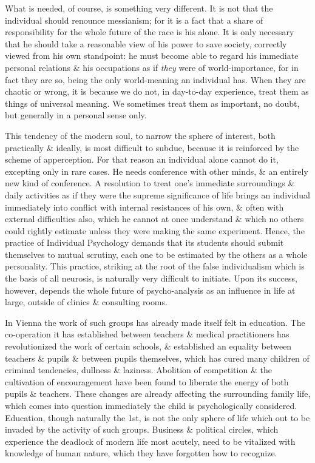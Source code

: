 \documentclass{article}
\numberwithin{equation}{section}
\begin{document}
What is needed, of course, is something very different. It is not that the individual should renounce messianism; for it is a fact that a share of responsibility for the whole future of the race is his alone. It is only necessary that he should take a reasonable view of his power to save society, correctly viewed from his own standpoint: he must become able to regard his immediate personal relations \& his occupations as if \textit{they} were of world-importance, for in fact they are so, being the only world-meaning an individual has. When they are chaotic or wrong, it is because we do not, in day-to-day experience, treat them as things of universal meaning. We sometimes treat them as important, no doubt, but generally in a personal sense only.

This tendency of the modern soul, to narrow the sphere of interest, both practically \& ideally, is most difficult to subdue, because it is reinforced by the scheme of apperception. For that reason an individual alone cannot do it, excepting only in rare cases. He needs conference with other minds, \& an entirely new kind of conference. A resolution to treat one's immediate surroundings \& daily activities as if they were the supreme significance of life brings an individual immediately into conflict with internal resistances of his own, \& often with external difficulties also, which he cannot at once understand \& which no others could rightly estimate unless they were making the same experiment. Hence, the practice of Individual Psychology demands that its students should submit themselves to mutual scrutiny, each one to be estimated by the others as a whole personality. This practice, striking at the root of the false individualism which is the basis of all neurosis, is naturally very difficult to initiate. Upon its success, however, depends the whole future of psycho-analysis as an influence in life at large, outside of clinics \& consulting rooms.

In Vienna the work of such groups has already made itself felt in education. The co-operation it has established between teachers \& medical practitioners has revolutionized the work of certain schools, \& established an equality between teachers \& pupils \& between pupils themselves, which has cured many children of criminal tendencies, dullness \& laziness. Abolition of competition \& the cultivation of encouragement have been found to liberate the energy of both pupils \& teachers. These changes are already affecting the surrounding family life, which comes into question immediately the child is psychologically considered. Education, though naturally the 1st, is not the only sphere of life which out to be invaded by the activity of such groups. Business \& political circles, which experience the deadlock of modern life most acutely, need to be vitalized with knowledge of human nature, which they have forgotten how to recognize.
\end{document}
